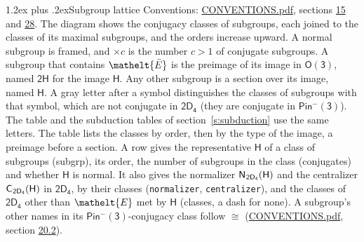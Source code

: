 \documentclass[10pt,a4paper]{article}
\makeatletter
\renewcommand\section{\@startsection{section}{1}{\z@}{-3ex plus -1ex minus -.2ex}%
  {1.2ex plus .2ex}{\normalfont\large\sffamily\bfseries\color{parttitle}}}
\numberwithin{equation}{section}
\newcommand{\eltfont}[1]{{\let\sigma\eltsigma\mathelt{#1}}}
\newcommand{\grp}[1]{\mathsf{#1}}
\newcommand{\cls}[1]{\eltfont{#1}}
\newcommand{\elt}[1]{\eltfont{#1}}
\newcommand{\samecls}{\cong}
\newcommand{\barred}[1]{\bar{#1}}
\newcommand{\hairsp}{\mkern1mu}
\makeatother
\begin{document}
\section{Subgroup lattice}\label{s:subgroups}
Conventions: \href{../../CONVENTIONS.pdf}{CONVENTIONS.pdf}, sections \href{../../../rotation/CONVENTIONS.pdf\#conv.15}{15} and \href{../../CONVENTIONS.pdf\#conv.28}{28}.
The diagram shows the conjugacy classes of subgroups, each joined to the classes of its maximal subgroups, and the orders increase upward. \label{n:index.conjugates.c}\label{n:mark.conjugates}A normal subgroup is framed, and ${\times}c$ is the number $c > 1$ of conjugate subgroups. \label{n:group.H}A subgroup that contains $\elt{\barred{E}}$ is the preimage of its image in $\grp{O(3)}$, named $\grp{2H}$ for the image $\grp{H}$. Any other subgroup is a section over its image, named $\grp{H}$. \label{n:mark.letter}A gray letter after a symbol distinguishes the classes of subgroups with that symbol, which are not conjugate in $\grp{2D_{4}}$ (they are conjugate in \href{Pinminus3.pdf}{$\grp{Pin^{-}(3)}$}). The table and the subduction tables of section~\ref{s:subduction} use the same letters. The table lists the classes by order, then by the type of the image, a preimage before a section. \label{n:head.subgroup}\label{n:head.order}\label{n:head.conjugates}\label{n:head.normal}A row gives the representative $\grp{H}$ of a class of subgroups (subgrp), its order, the number of subgroups in the class (conjugates) and whether $\grp{H}$ is normal. \label{n:group.normalizer}\label{n:group.centralizer}\label{n:head.classes}It also gives the normalizer $\grp{N}_{\hairsp \grp{2D_{4}}}(\grp{H})$ and the centralizer $\grp{C}_{\hairsp \grp{2D_{4}}}(\grp{H})$ in $\grp{2D_{4}}$, by their classes (\texttt{normalizer}, \texttt{centralizer}), and the classes of $\grp{2D_{4}}$ other than $\cls{E}$ met by $\grp{H}$ (classes, a dash for none). A subgroup's other names in its \href{Pinminus3.pdf}{$\grp{Pin^{-}(3)}$}-conjugacy class follow $\samecls$ (\href{../../CONVENTIONS.pdf}{CONVENTIONS.pdf}, section \href{../../CONVENTIONS.pdf\#conv.20.2}{20.2}).
\end{document}
